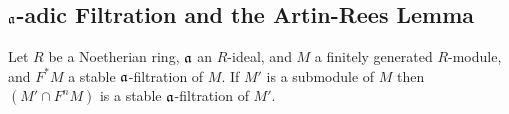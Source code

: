 \subsection{$\mathfrak{a}$-adic Filtration and the Artin-Rees Lemma}

\begin{thm}\label{thm:artin_rees_lemma}
Let $R$ be a Noetherian ring, $\mathfrak{a}$ an $R$-ideal, and $M$ a
finitely generated $R$-module, and $F^*M$ a stable 
$\mathfrak{a}$-filtration of $M$. If $M'$ is a submodule of $M$ then
$(M' \cap F^nM)$ is a stable $\mathfrak{a}$-filtration of $M'$.
\end{thm}
